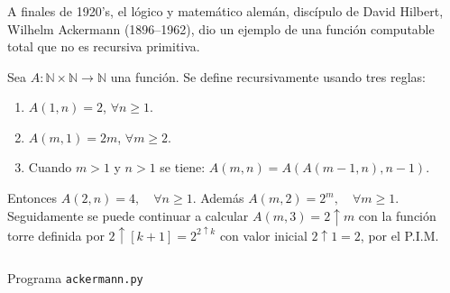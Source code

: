 \begin{frame}
\frametitle{\subsubsecname}
A finales de 1920's, el lógico y matemático alemán, discípulo de David Hilbert, Wilhelm Ackermann (1896–1962), dio un ejemplo de una función computable total que no es recursiva primitiva.

\begin{minipage}{0.45\paperwidth}
	\begin{definition}[Ackermann]
		Sea $A\colon\mathds{N}\times\mathds{N}\rightarrow\mathds{N}$ una función. Se define recursivamente usando tres reglas:
		\begin{enumerate}
			\item $A(1,n)=2$, $\forall n\geq 1$.
			\item $A(m,1)=2m$, $\forall m\geq 2$.
			\item Cuando $m>1$ y $n>1$ se tiene: $A\left(m,n\right)=A\left(A(m-1,n),n-1\right)$.
		\end{enumerate}
	\end{definition}
	\begin{remark}
		Entonces $A\left(2,n\right)=4,\quad\forall n\geq1$. Además $A\left(m,2\right)=2^{m},\quad\forall m\geq 1$. Seguidamente se puede continuar a calcular $A\left(m,3\right)=2\uparrow m$ con la función torre definida por $2\uparrow\left[k+1\right]=2^{2\uparrow k}$ con valor inicial $2\uparrow 1=2$, por el P.I.M.
	\end{remark}
\end{minipage}
\hfill
\begin{minipage}{0.45\paperwidth}
	\begin{listing}[H]
		\inputminted{python}{./code/ackermann.py}
		\caption{Programa \texttt{ackermann.py}}
	\end{listing}
\end{minipage}

\end{frame}